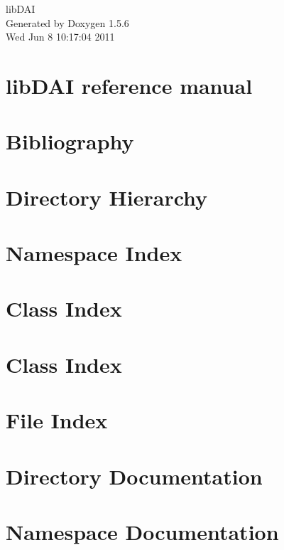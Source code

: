 \documentclass[a4paper]{book}
\begin{document}
\begin{titlepage}
\vspace*{7cm}
\begin{center}
{\Large libDAI }\\
\vspace*{1cm}
{\large Generated by Doxygen 1.5.6}\\
\vspace*{0.5cm}
{\small Wed Jun 8 10:17:04 2011}\\
\end{center}
\end{titlepage}
\clearemptydoublepage
{}
\tableofcontents
\clearemptydoublepage
{}
\chapter{libDAI reference manual}
\label{index}\hypertarget{index}{}
\chapter{Bibliography}
\label{Bibliography}
\hypertarget{Bibliography}{}

\chapter{Directory Hierarchy}

\chapter{Namespace Index}

\chapter{Class Index}

\chapter{Class Index}

\chapter{File Index}

\chapter{Directory Documentation}



\chapter{Namespace Documentation}

\end{document}
